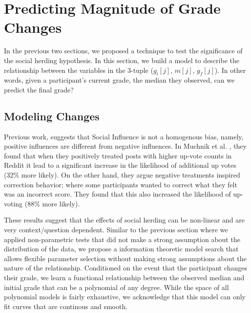 \section{Predicting Magnitude of Grade Changes}
\label{changemod}
In the previous two sections, we proposed a technique to test the significance of the social herding hypothesis.
In this section, we build a model to describe the relationship between the variables in the 3-tuple ($g_i[j]$, $m[j]$, $g_f[j]$).
In other words, given a participant's current grade, the median they observed, can we predict the final grade?

\subsection{Modeling Changes}
Previous work, suggests that Social Influence is not a homogenous bias, namely, positive influences are different from negative influences.
In Muchnik et al. \cite{muchnik2013social}, they found that when they positively treated posts with higher up-vote counts in Reddit it lead to a significant increase in the likelihood of additional up votes (32\% more likely). 
On the other hand, they argue negative treatments inspired correction behavior; where some participants wanted to correct what they felt was an incorrect score. 
They found that this also increased the likelihood of up-voting (88\% more likely).

These results suggest that the effects of social herding can be non-linear and are very context/question dependent.
Similar to the previous section where we applied non-parametric tests that did not make a strong assumption about the distribution of the data, we propose a information theoretic model search that allows flexible parameter selection without making strong assumptions about the nature of the relationship.
Conditioned on the event that the participant changes their grade, we learn a functional relationship between the observed median and initial grade that can be a polynomial of any degree.
While the space of all polynomial models is fairly exhaustive, we acknowledge that this model can only fit curves that are continous and smooth.

